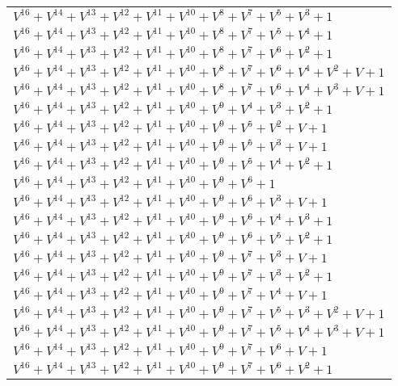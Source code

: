 \documentclass[12pt]{article}
\begin{document}
\begin{adjustwidth}{-4cm}{}
\begin{center}
\begin{longtable}{|l|}
$V^{16}  +V^{14}  +V^{13}  +V^{12}  +V^{11}  +V^{10}  +V^{8}  +V^{7}  +V^{5}  +V^{3}  + 1$ \\
$V^{16}  +V^{14}  +V^{13}  +V^{12}  +V^{11}  +V^{10}  +V^{8}  +V^{7}  +V^{5}  +V^{4}  + 1$ \\
$V^{16}  +V^{14}  +V^{13}  +V^{12}  +V^{11}  +V^{10}  +V^{8}  +V^{7}  +V^{6}  +V^{2}  + 1$ \\
$V^{16}  +V^{14}  +V^{13}  +V^{12}  +V^{11}  +V^{10}  +V^{8}  +V^{7}  +V^{6}  +V^{4}  +V^{2}  + V + 1$ \\
$V^{16}  +V^{14}  +V^{13}  +V^{12}  +V^{11}  +V^{10}  +V^{8}  +V^{7}  +V^{6}  +V^{4}  +V^{3}  + V + 1$ \\
$V^{16}  +V^{14}  +V^{13}  +V^{12}  +V^{11}  +V^{10}  +V^{9}  +V^{4}  +V^{3}  +V^{2}  + 1$ \\
$V^{16}  +V^{14}  +V^{13}  +V^{12}  +V^{11}  +V^{10}  +V^{9}  +V^{5}  +V^{2}  + V + 1$ \\
$V^{16}  +V^{14}  +V^{13}  +V^{12}  +V^{11}  +V^{10}  +V^{9}  +V^{5}  +V^{3}  + V + 1$ \\
$V^{16}  +V^{14}  +V^{13}  +V^{12}  +V^{11}  +V^{10}  +V^{9}  +V^{5}  +V^{4}  +V^{2}  + 1$ \\
$V^{16}  +V^{14}  +V^{13}  +V^{12}  +V^{11}  +V^{10}  +V^{9}  +V^{6}  + 1$ \\
$V^{16}  +V^{14}  +V^{13}  +V^{12}  +V^{11}  +V^{10}  +V^{9}  +V^{6}  +V^{3}  + V + 1$ \\
$V^{16}  +V^{14}  +V^{13}  +V^{12}  +V^{11}  +V^{10}  +V^{9}  +V^{6}  +V^{4}  +V^{3}  + 1$ \\
$V^{16}  +V^{14}  +V^{13}  +V^{12}  +V^{11}  +V^{10}  +V^{9}  +V^{6}  +V^{5}  +V^{2}  + 1$ \\
$V^{16}  +V^{14}  +V^{13}  +V^{12}  +V^{11}  +V^{10}  +V^{9}  +V^{7}  +V^{3}  + V + 1$ \\
$V^{16}  +V^{14}  +V^{13}  +V^{12}  +V^{11}  +V^{10}  +V^{9}  +V^{7}  +V^{3}  +V^{2}  + 1$ \\
$V^{16}  +V^{14}  +V^{13}  +V^{12}  +V^{11}  +V^{10}  +V^{9}  +V^{7}  +V^{4}  + V + 1$ \\
$V^{16}  +V^{14}  +V^{13}  +V^{12}  +V^{11}  +V^{10}  +V^{9}  +V^{7}  +V^{5}  +V^{3}  +V^{2}  + V + 1$ \\
$V^{16}  +V^{14}  +V^{13}  +V^{12}  +V^{11}  +V^{10}  +V^{9}  +V^{7}  +V^{5}  +V^{4}  +V^{3}  + V + 1$ \\
$V^{16}  +V^{14}  +V^{13}  +V^{12}  +V^{11}  +V^{10}  +V^{9}  +V^{7}  +V^{6}  + V + 1$ \\
$V^{16}  +V^{14}  +V^{13}  +V^{12}  +V^{11}  +V^{10}  +V^{9}  +V^{7}  +V^{6}  +V^{2}  + 1$ \\

\end{longtable}
\end{center}
\end{adjustwidth}
\end{document}
